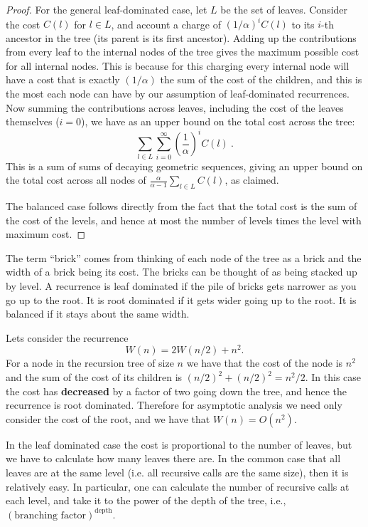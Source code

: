 \begin{flex}
\begin{proof}
  For the general leaf-dominated case, let
  $L$ be the set of leaves.
%
  Consider the cost $C(l)$ for $l \in L$, and account a charge of
  $(1/\alpha)^i C(l)$ to its $i$-th ancestor in the tree (its parent
  is its first ancestor).
%
  Adding up the contributions from every leaf to the internal nodes of
  the tree gives the maximum possible cost for all internal nodes.
%
  This is because for this charging every internal node will have a
  cost that is exactly $(1/\alpha)$ the sum of the cost of the
  children, and this is the most each node can have by our assumption of
  leaf-dominated recurrences.
%
  Now summing the contributions across leaves, including the cost of
  the leaves themselves ($i = 0$), we have as an upper bound on the
  total cost across the tree:
  \[\sum_{l \in L} \sum_{i=0}^{\infty}  \left(\frac{1}{\alpha}\right)^i C(l)~. \]
%
  This is a sum of sums of decaying geometric sequences, giving an
  upper bound on the total cost
  across all nodes of 
  $\frac{\alpha}{\alpha -1} \sum_{l \in L} C(l)$, as claimed.

%
  The balanced case follows directly from the fact that the total cost
  is the sum of the cost of the levels, and hence at most the number
  of levels times the level with maximum cost.
\end{proof}
\end{flex}

\begin{remark}
  The term ``brick'' comes from thinking of each node of the tree as a 
  brick and the width of a brick being its cost.  The bricks can be
  thought of as being stacked up  by level.    A recurrence is leaf dominated if the pile of bricks 
  gets narrower as you go up to the root.  It is root dominated if it 
  gets wider going up to the root.  It is balanced 
  if it stays about the same width. 
\end{remark}

\begin{example}
Lets consider the recurrence 
\[W(n) = 2 W(n/2) + n^2.\]
For a node in the recursion tree of size $n$ we have that the cost of
the node is $n^2$ and the sum of the cost of its children is
$(n/2)^2 + (n/2)^2 = n^2/2$.  In this case the cost has
\textbf{decreased} by a factor of two going down the tree, and hence
the recurrence is root dominated.  Therefore for asymptotic analysis
we need only consider the cost of the root, and we have that
$W(n) = O(n^2)$.
\end{example}

\begin{gram}
  In the leaf dominated case the cost is proportional to the number of
  leaves, but we have to calculate how many leaves there are.  In the common case that all leaves are at the 
  same level (i.e. all recursive calls are the same size), then it is 
  relatively easy.  In particular, one can calculate the number of 
  recursive calls at each level, and take it to the power of the 
  depth of the tree, i.e., $(\mbox{branching factor})^{\mbox{depth}}$.
\end{gram}

